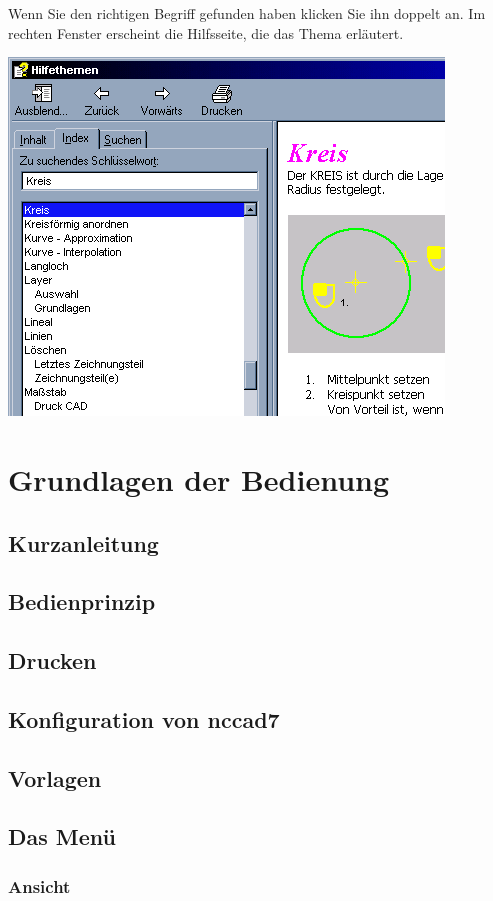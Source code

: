 \documentclass[a4paper]{book}
\begin{document}
Wenn Sie den richtigen Begriff gefunden haben klicken Sie ihn doppelt an. Im rechten Fenster 
erscheint die Hilfsseite, die das Thema erläutert.

\includegraphics{pic/Suche3.png}


\chapter{Grundlagen der Bedienung} 
	\section{Kurzanleitung}
	\section{Bedienprinzip}
	\section{Drucken}
	\section{Konfiguration von nccad7}
	\section{Vorlagen}
	\section{Das Menü}
		\subsection{Ansicht}
\end{document}
